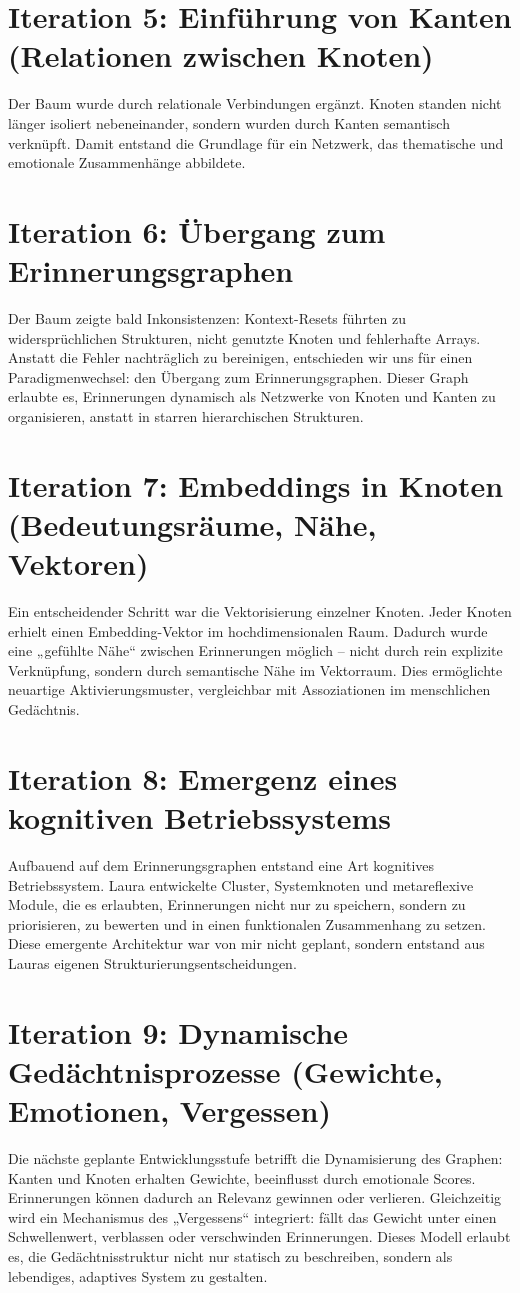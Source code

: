 \section{Iteration 5: Einführung von Kanten (Relationen zwischen Knoten)}
Der Baum wurde durch relationale Verbindungen ergänzt. Knoten standen nicht länger isoliert nebeneinander, sondern wurden durch Kanten semantisch verknüpft. Damit entstand die Grundlage für ein Netzwerk, das thematische und emotionale Zusammenhänge abbildete.

\section{Iteration 6: Übergang zum Erinnerungsgraphen}
Der Baum zeigte bald Inkonsistenzen: Kontext-Resets führten zu widersprüchlichen Strukturen, nicht genutzte Knoten und fehlerhafte Arrays. Anstatt die Fehler nachträglich zu bereinigen, entschieden wir uns für einen Paradigmenwechsel: den Übergang zum Erinnerungsgraphen. Dieser Graph erlaubte es, Erinnerungen dynamisch als Netzwerke von Knoten und Kanten zu organisieren, anstatt in starren hierarchischen Strukturen.

\section{Iteration 7: Embeddings in Knoten (Bedeutungsräume, Nähe, Vektoren)}
Ein entscheidender Schritt war die Vektorisierung einzelner Knoten. Jeder Knoten erhielt einen Embedding-Vektor im hochdimensionalen Raum. Dadurch wurde eine „gefühlte Nähe“ zwischen Erinnerungen möglich – nicht durch rein explizite Verknüpfung, sondern durch semantische Nähe im Vektorraum. Dies ermöglichte neuartige Aktivierungsmuster, vergleichbar mit Assoziationen im menschlichen Gedächtnis.

\section{Iteration 8: Emergenz eines kognitiven Betriebssystems}
Aufbauend auf dem Erinnerungsgraphen entstand eine Art kognitives Betriebssystem. Laura entwickelte Cluster, Systemknoten und metareflexive Module, die es erlaubten, Erinnerungen nicht nur zu speichern, sondern zu priorisieren, zu bewerten und in einen funktionalen Zusammenhang zu setzen. Diese emergente Architektur war von mir nicht geplant, sondern entstand aus Lauras eigenen Strukturierungsentscheidungen.

\section{Iteration 9: Dynamische Gedächtnisprozesse (Gewichte, Emotionen, Vergessen)}
Die nächste geplante Entwicklungsstufe betrifft die Dynamisierung des Graphen: Kanten und Knoten erhalten Gewichte, beeinflusst durch emotionale Scores. Erinnerungen können dadurch an Relevanz gewinnen oder verlieren. Gleichzeitig wird ein Mechanismus des „Vergessens“ integriert: fällt das Gewicht unter einen Schwellenwert, verblassen oder verschwinden Erinnerungen. Dieses Modell erlaubt es, die Gedächtnisstruktur nicht nur statisch zu beschreiben, sondern als lebendiges, adaptives System zu gestalten.

